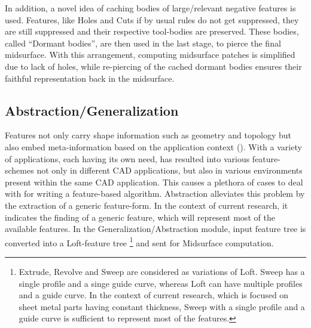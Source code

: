 
In addition, a novel idea of caching bodies of large/relevant negative features is used.  Features, like Holes and Cuts if by usual rules do not get suppressed, they are still suppressed and their respective tool-bodies are preserved. These bodies, called ``Dormant bodies'', are then used in the last stage, to pierce the final midsurface. With this arrangement, computing midsurface patches is simplified due to lack of holes, while re-piercing of the cached dormant bodies ensures their faithful representation back in the midsurface.

\subsection{Abstraction/Generalization}\label{sec:abstraction}
Features not only carry shape information such as geometry and topology but also embed meta-information based on the application context (\cite{Shah1995}). With a variety of applications, each having its own need,  has resulted into various feature-schemes not only in different CAD applications, but also in various environments present within the same CAD application.  This causes a plethora of cases to deal with for writing a feature-based algorithm. Abstraction alleviates this problem by the extraction of a generic feature-form.  In the context of current research, it indicates the  finding of a generic feature, which will represent most of the available features. In the Generalization/Abstraction module, input feature tree is converted into a Loft-feature tree \footnote{Extrude, Revolve and Sweep are considered as variations of Loft. Sweep has a single profile and a singe guide curve, whereas Loft can have multiple profiles and a guide curve. In the context of current research, which is focused on sheet metal parts having constant thickness, Sweep with a single profile and a guide curve is sufficient to represent most of the features.} and sent for Midsurface computation. 

